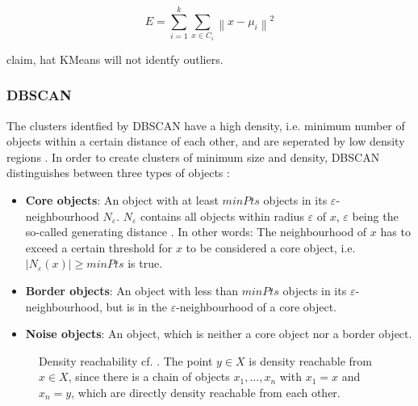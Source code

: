 \begin{equation}
    E = \sum_{i=1}^{k} \sum_{x \in C_{i}}\left\|x-\mu_{i}\right\|^{2}
\label{eq:kmeans-error}
\end{equation}

\citeauthor{OPTICS_kMeans_2016} claim, hat KMeans will not identfy outliers.


\subsubsection{DBSCAN}\label{subsec:dbscan}

The clusters identfied by DBSCAN have a high density, i.e. minimum number of objects within a certain distance of each other, and are seperated by low density regions \cite{OPTICS_kMeans_2016}.
In order to create clusters of minimum size and density, DBSCAN distinguishes between three types of objects \cite{OPTICS_kMeans_2016}:

\begin{itemize}
    \item \textbf{Core objects}: 
    An object with at least $minPts$ objects in its $\varepsilon$-neighbourhood $N_\varepsilon$.
    $N_\varepsilon$ contains all objects within radius $\varepsilon$ of $x$, $\varepsilon$ being the so-called generating distance \cite{OPTICS2013}.
    In other words: The neighbourhood of $x$ has to exceed a certain threshold for $x$ to be considered a core object, i.e. $| N_\varepsilon (x) | \geq minPts$ is true.

    \item \textbf{Border objects}: 
    An object with less than $minPts$ objects in its $\varepsilon$-neighbourhood, but is in the $\varepsilon$-neighbourhood of a core object.

    \item \textbf{Noise objects}: 
    An object, which is neither a core object nor a border object.
\end{itemize}

\begin{figure}[htp] %
    \centering
    
    \caption{Density reachability cf. \cite{OPTICS1999}.
    The point $y \in X$ is density reachable from $x \in X$, since there is a chain of objects $x_1, ..., x_n$ with $x_1 = x$ and $x_n = y$, 
    which are directly density reachable from each other.
    }
    \label{fig:density_reachable}
\end{figure}

